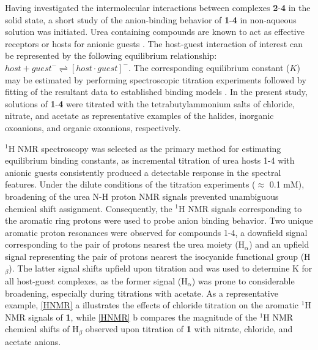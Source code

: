 Having investigated the intermolecular interactions between complexes \textbf{2}-\textbf{4} in the solid state, a short study of the anion-binding behavior of \textbf{1}-\textbf{4} in non-aqueous solution was initiated. Urea containing compounds are known to act as effective receptors or hosts for anionic guests \citep{Custelcean2008, BlazekBregovic2015, Li2010d, Pfeifer2016, Boiocchi2004, Amendola2013, Esteban-Gomez2005, Amendola2010, Custelcean2006, Evans2014, Gale2011, Busschaert2015, Custelcean2010}. The host-guest interaction of interest can be represented by the following equilibrium relationship: $host + guest^{-} \rightleftharpoons [host\cdot guest]^{-}$. The corresponding equilibrium constant ($K$) may be estimated by performing spectroscopic titration experiments followed by fitting of the resultant data to established binding models \cite{Thordarson2011, BrynnHibbert2016}. In the present study, solutions of \textbf{1}-\textbf{4} were titrated with the tetrabutylammonium salts of chloride, nitrate, and acetate as representative examples of the halides, inorganic oxoanions, and organic oxoanions, respectively. 

$^{1}$H NMR spectroscopy was selected as the primary method for estimating equilibrium binding constants, as incremental titration of urea hosts 1-4 with anionic guests consistently produced a detectable response in the spectral features. Under the dilute conditions of the titration experiments ($\approx$ 0.1 mM), broadening of the urea N-H proton NMR signals prevented unambiguous chemical shift assignment. Consequently, the $^{1}$H NMR signals corresponding to the aromatic ring protons were used to probe anion binding behavior. Two unique aromatic proton resonances were observed for compounds 1-4, a downfield signal corresponding to the pair of protons nearest the urea moiety (H$_{\alpha}$) and an upfield signal representing the pair of protons nearest the isocyanide functional group (H$_{\beta}$). The latter signal shifts upfield upon titration and was used to determine K for all host-guest complexes, as the former signal (H$_{\alpha}$) was prone to considerable broadening, especially during titrations with acetate. 
As a representative example, \autoref{HNMR} a illustrates the effects of chloride titration on the aromatic $^{1}$H NMR signals of \textbf{1}, while \autoref{HNMR} b compares the magnitude of the $^{1}$H NMR chemical shifts of H$_{\beta}$ observed upon titration of \textbf{1} with nitrate, chloride, and acetate anions.    

